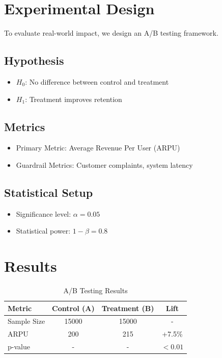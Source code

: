 \documentclass[conference]{IEEEtran}
\begin{document}
\section{Experimental Design}
To evaluate real-world impact, we design an A/B testing framework.

\subsection{Hypothesis}
\begin{itemize}
    \item $H_0$: No difference between control and treatment
    \item $H_1$: Treatment improves retention
\end{itemize}

\subsection{Metrics}
\begin{itemize}
    \item Primary Metric: Average Revenue Per User (ARPU)
    \item Guardrail Metrics: Customer complaints, system latency
\end{itemize}

\subsection{Statistical Setup}
\begin{itemize}
    \item Significance level: $\alpha = 0.05$
    \item Statistical power: $1 - \beta = 0.8$
\end{itemize}

\section{Results}

\begin{table}[h]
\centering
\begin{tabular}{lccc}
\toprule
Metric & Control (A) & Treatment (B) & Lift \\
\midrule
Sample Size & 15000 & 15000 & - \\
ARPU & 200 & 215 & +7.5\% \\
p-value & - & - & $<0.01$ \\
\bottomrule
\end{tabular}
\caption{A/B Testing Results}
\end{table}
\end{document}
